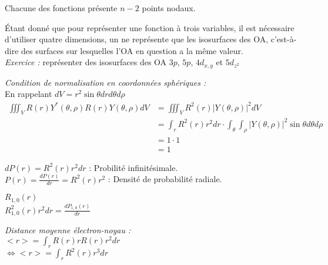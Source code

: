 \documentclass[../main.tex]{subfile}
\begin{document}
 \begin{rema} 
      Chacune des fonctions présente $n-2$ points nodaux.
 \end{rema}


   Étant donné que pour représenter une fonction à trois variables, il est nécessaire d'utiliser quatre dimensions, un ne représente que les isosurfaces des OA, c'est-à-dire des surfaces sur lesquelles l'OA en question a la même valeur.\\


   \emph{Exercice :} représenter des isosurfaces des OA $3p$, $5p$, $4d_{x,y}$ et $5d_{z^2}$


   \emph{Condition de normalisation en coordonnées sphériques :}\\

   En rappelant $dV = r^2 \sin \theta dr d\theta d\rho$
   $$
\begin{aligned}
      \iiint_V R(r) Y^*(\theta, \rho) R(r) Y(\theta, \rho) dV&= \iiint_V R^2(r) |Y(\theta, \rho)|^2 dV\\
      &= \int_r R^2(r) r^2dr \cdot \int_\theta \int_\rho |Y(\theta, \rho)|^2 \sin \theta d\theta d\rho\\
      &= 1 \cdot 1\\
      &=1
\end{aligned}
   $$


   $dP(r) = R^2(r)r^2 dr$ : Probilité infinitésimale.\\

   $P(r) = \frac{dP(r)}{dr} = R^2(r) r^2$ : Densité de probabilité radiale.\\

  \begin{ex} 
      $R_{1,0}(r)$\\

      $R_{1,0}^2(r) r^2 dr = \frac{dP_{1,0}(r)}{dr}$
  \end{ex}


  \emph{Distance moyenne électron-noyau : }\\
  $<r> = \int_r R(r) r R(r) r^2 dr$\\
  $\Leftrightarrow <r> = \int_r R^2(r) r^3 dr$
\end{document}
